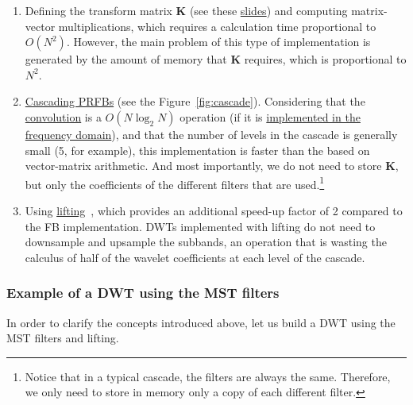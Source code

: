 \begin{enumerate}

\item Defining the transform matrix ${\mathbf K}$ (see these
  \href{https://cseweb.ucsd.edu/classes/fa17/cse166-a/lec13.pdf}{slides})
  and computing matrix-vector multiplications, which requires a
  calculation time proportional to $O(N^2)$. However, the main problem
  of this type of implementation is generated by the amount of memory
  that ${\mathbf K}$ requires, which is proportional to $N^2$.

\item
  \href{https://en.wikipedia.org/wiki/Discrete_wavelet_transform#Cascading_and_filter_banks}{Cascading
    PRFBs} (see the Figure~\ref{fig:cascade}). Considering that the
  \href{https://en.wikipedia.org/wiki/Convolution}{convolution} is a
  $O(N\log_2N)$ operation (if it is
  \href{https://en.wikipedia.org/wiki/Convolution_theorem}{implemented
    in the frequency domain}), and that the number of levels in the
  cascade is generally small (5, for example), this implementation is
  faster than the based on vector-matrix arithmetic. And most
  importantly, we do not need to store ${\mathbf K}$, but only the coefficients
  of the different filters that are used.\footnote{Notice that in a
    typical cascade, the filters are always the same. Therefore, we
    only need to store in memory only a copy of each different filter.}

\item Using
  \href{https://en.wikipedia.org/wiki/Lifting_scheme}{lifting}~\cite{sweldens1997building},
  which provides an additional speed-up factor of 2 compared to the FB
  implementation. DWTs implemented with lifting do not need to
  downsample and upsample the subbands, an operation that is wasting
  the calculus of half of the wavelet coefficients at each level of
  the cascade.

\end{enumerate}


\subsubsection{Example of a DWT using the MST filters}

In order to clarify the concepts introduced above, let us build a
DWT using the MST filters and lifting.

